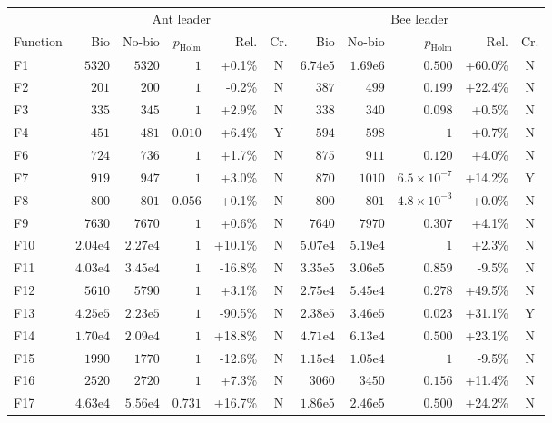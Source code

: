 \begin{tabular}{lrrrrcrrrrc}
\toprule
 & \multicolumn{5}{c}{Ant leader} & \multicolumn{5}{c}{Bee leader} \\
Function & Bio & No-bio & $p_{\mathrm{Holm}}$ & Rel. & Cr. & Bio & No-bio & $p_{\mathrm{Holm}}$ & Rel. & Cr. \\
\midrule
F1 & $5320$ & $5320$ & $1$ & +0.1\% & N & $6.74\mathrm{e}{5}$ & $1.69\mathrm{e}{6}$ & $0.500$ & +60.0\% & N \\
F2 & $201$ & $200$ & $1$ & -0.2\% & N & $387$ & $499$ & $0.199$ & +22.4\% & N \\
F3 & $335$ & $345$ & $1$ & +2.9\% & N & $338$ & $340$ & $0.098$ & +0.5\% & N \\
F4 & $451$ & $481$ & $0.010$ & +6.4\% & Y & $594$ & $598$ & $1$ & +0.7\% & N \\
F6 & $724$ & $736$ & $1$ & +1.7\% & N & $875$ & $911$ & $0.120$ & +4.0\% & N \\
F7 & $919$ & $947$ & $1$ & +3.0\% & N & $870$ & $1010$ & $6.5\times10^{-7}$ & +14.2\% & Y \\
F8 & $800$ & $801$ & $0.056$ & +0.1\% & N & $800$ & $801$ & $4.8\times10^{-3}$ & +0.0\% & N \\
F9 & $7630$ & $7670$ & $1$ & +0.6\% & N & $7640$ & $7970$ & $0.307$ & +4.1\% & N \\
F10 & $2.04\mathrm{e}{4}$ & $2.27\mathrm{e}{4}$ & $1$ & +10.1\% & N & $5.07\mathrm{e}{4}$ & $5.19\mathrm{e}{4}$ & $1$ & +2.3\% & N \\
F11 & $4.03\mathrm{e}{4}$ & $3.45\mathrm{e}{4}$ & $1$ & -16.8\% & N & $3.35\mathrm{e}{5}$ & $3.06\mathrm{e}{5}$ & $0.859$ & -9.5\% & N \\
F12 & $5610$ & $5790$ & $1$ & +3.1\% & N & $2.75\mathrm{e}{4}$ & $5.45\mathrm{e}{4}$ & $0.278$ & +49.5\% & N \\
F13 & $4.25\mathrm{e}{5}$ & $2.23\mathrm{e}{5}$ & $1$ & -90.5\% & N & $2.38\mathrm{e}{5}$ & $3.46\mathrm{e}{5}$ & $0.023$ & +31.1\% & Y \\
F14 & $1.70\mathrm{e}{4}$ & $2.09\mathrm{e}{4}$ & $1$ & +18.8\% & N & $4.71\mathrm{e}{4}$ & $6.13\mathrm{e}{4}$ & $0.500$ & +23.1\% & N \\
F15 & $1990$ & $1770$ & $1$ & -12.6\% & N & $1.15\mathrm{e}{4}$ & $1.05\mathrm{e}{4}$ & $1$ & -9.5\% & N \\
F16 & $2520$ & $2720$ & $1$ & +7.3\% & N & $3060$ & $3450$ & $0.156$ & +11.4\% & N \\
F17 & $4.63\mathrm{e}{4}$ & $5.56\mathrm{e}{4}$ & $0.731$ & +16.7\% & N & $1.86\mathrm{e}{5}$ & $2.46\mathrm{e}{5}$ & $0.500$ & +24.2\% & N \\

\end{tabular}
